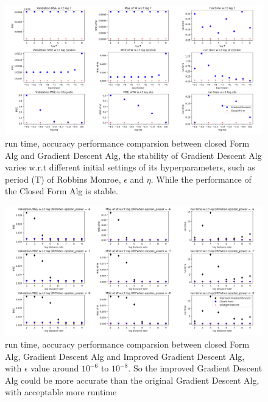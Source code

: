 \documentclass[letterpaper, 11pt]{article}
\renewcommand{\headrulewidth}{0pt}
\renewcommand{\footrulewidth}{0pt}
\begin{document}
\endgroup
\renewcommand{\thepage}{}

%









\begin{figure}[!ht]
  \includegraphics[width=\linewidth]{fig/figure_cf_vs_gd.png}
  \caption{run time, accuracy performance comparsion between closed Form Alg and Gradient Descent Alg, the stability of Gradient Descent Alg varies w.r.t different initial settings of its hyperparameters, such as period (T) of Robbins Monroe, $\epsilon$ and $\eta$. While the performance of the Closed Form Alg is stable.}
  \label{fig:cf_vs_gd}
\end{figure}


\begin{figure}[!ht]
  \includegraphics[width=\linewidth]{fig/figure_cf_vs_2_gd_revised.png}
  \caption{run time, accuracy performance comparsion between closed Form Alg, Gradient Descent Alg and Improved Gradient Descent Alg, with $\epsilon$ value around $10^{-6}$ to $10^{-8}$. So the improved Gradient Descent Alg could be more accurate than the original Gradient Descent Alg, with acceptable more runtime}
  \label{fig:cf_vs_2gd}
\end{figure}
\end{document}
